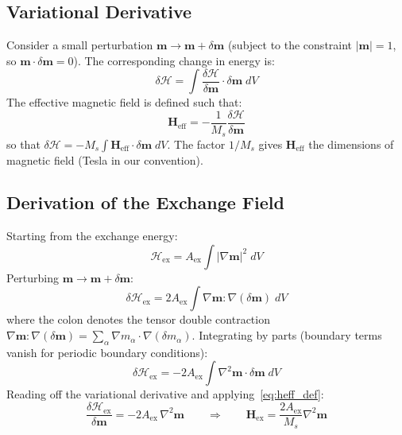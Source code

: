 \documentclass[11pt,a4paper]{article}
\newcommand{\mb}[1]{\mathbf{#1}}
\newcommand{\Heff}{\mb{H}_{\text{eff}}}
\newcommand{\Hex}{\mb{H}_{\text{ex}}}
\newcommand{\Aex}{A_{\text{ex}}}
\newcommand{\Ms}{M_s}
\begin{document}
\subsection{Variational Derivative}

Consider a small perturbation
$\mb{m} \to \mb{m} + \delta\mb{m}$ (subject to the constraint
$|\mb{m}| = 1$, so $\mb{m} \cdot \delta\mb{m} = 0$).  The
corresponding change in energy is:
%
\begin{equation}
\delta\mathcal{H} = \int
    \frac{\delta\mathcal{H}}{\delta\mb{m}}
    \cdot \delta\mb{m} \; dV
\end{equation}
%
The effective magnetic field is defined such that:
%
\begin{equation}\label{eq:heff_def}
\boxed{\;
\Heff = -\frac{1}{\Ms}
    \frac{\delta\mathcal{H}}{\delta\mb{m}}
\;}
\end{equation}
%
so that $\delta\mathcal{H} = -\Ms \int \Heff \cdot
\delta\mb{m} \; dV$.  The factor $1/\Ms$ gives $\Heff$ the
dimensions of magnetic field (Tesla in our convention).

\subsection{Derivation of the Exchange Field}

Starting from the exchange energy:
%
\begin{equation}
\mathcal{H}_{\text{ex}} = \Aex \int
    |\nabla\mb{m}|^2 \; dV
\end{equation}
%
Perturbing $\mb{m} \to \mb{m} + \delta\mb{m}$:
%
\begin{equation}
\delta\mathcal{H}_{\text{ex}} = 2\Aex \int
    \nabla\mb{m} : \nabla(\delta\mb{m}) \; dV
\end{equation}
%
where the colon denotes the tensor double contraction
$\nabla\mb{m} : \nabla(\delta\mb{m})
= \sum_\alpha \nabla m_\alpha \cdot \nabla(\delta m_\alpha)$.
Integrating by parts (boundary terms vanish for periodic boundary
conditions):
%
\begin{equation}
\delta\mathcal{H}_{\text{ex}} =
    -2\Aex \int \nabla^2\mb{m} \cdot \delta\mb{m} \; dV
\end{equation}
%
Reading off the variational derivative and applying~\eqref{eq:heff_def}:
%
\begin{equation}
\frac{\delta\mathcal{H}_{\text{ex}}}{\delta\mb{m}}
    = -2\Aex \, \nabla^2\mb{m}
\qquad\Longrightarrow\qquad
\Hex = \frac{2\Aex}{\Ms} \nabla^2\mb{m}
\end{equation}
\end{document}
